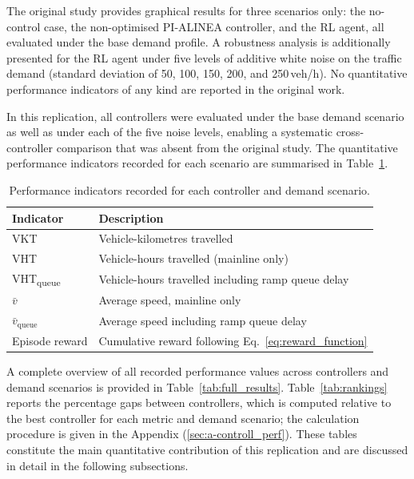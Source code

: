 
The original study provides graphical results for three scenarios only: the
no-control case, the non-optimised PI-ALINEA controller, and the RL agent,
all evaluated under the base demand profile. A robustness analysis is
additionally presented for the RL agent under five levels of additive white
noise on the traffic demand (standard deviation of 50, 100, 150, 200, and
250\,veh/h). No quantitative performance indicators of any kind are reported
in the original work.

In this replication, all controllers were evaluated under the base demand
scenario as well as under each of the five noise levels, enabling a
systematic cross-controller comparison that was absent from the original
study. The quantitative performance indicators recorded for each scenario
are summarised in Table~\ref{tab:indicators}.

\begin{table}[h]
\centering
\caption{Performance indicators recorded for each controller and demand
scenario.}
\label{tab:indicators}
\begin{tabular}{ll}
\hline
\textbf{Indicator} & \textbf{Description} \\
\hline
VKT & Vehicle-kilometres travelled \\
VHT & Vehicle-hours travelled (mainline only) \\
VHT\textsubscript{queue} & Vehicle-hours travelled including ramp queue delay \\
$\bar{v}$ & Average speed, mainline only \\
$\bar{v}_\text{queue}$ & Average speed including ramp queue delay \\
Episode reward & Cumulative reward following Eq.~\ref{eq:reward_function} \\
\hline
\end{tabular}
\end{table}

A complete overview of all recorded performance values across controllers
and demand scenarios is provided in Table~\ref{tab:full_results}. Table~\ref{tab:rankings} reports the percentage gaps between controllers, which is computed relative to the best controller for each metric and demand scenario; the calculation procedure is given in the Appendix (\ref{sec:a-controll_perf}). These tables constitute the main quantitative
contribution of this replication and are discussed in detail in the
following subsections.

